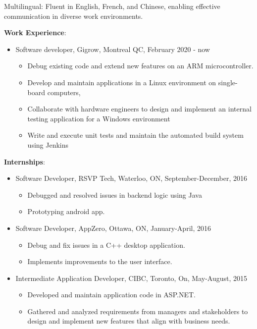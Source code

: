 \documentclass[letterpaper]{article}
\begin{document}
Multilingual: Fluent in English, French, and Chinese, enabling effective communication in diverse work environments.\\



\begin{large}
\textbf{Work Experience}:
\end{large}
\begin{itemize}[leftmargin=5.5mm]
\item Software developer, Gigrow, Montreal QC, February 2020 - now
	\begin{itemize} 
	\item Debug existing code and extend new features on an ARM microcontroller. 
	\item Develop and maintain applications in a Linux environment on single-board computers,
	\item Collaborate with hardware engineers to design and implement an internal testing application for a Windows environment
	\item Write and execute unit tests and maintain the automated build system using Jenkins
	\end{itemize}
\end{itemize}

\begin{large}
\textbf{Internships}:
\end{large}
\begin{itemize}[leftmargin=*]
\item Software Developer,  RSVP Tech, Waterloo, ON, September-December, 2016
	\begin{itemize}
     \item Debugged and resolved issues in backend logic using Java
     \item Prototyping android app.
     \end{itemize}
\item Software Developer,  AppZero, Ottawa, ON, January-April, 2016
	\begin{itemize}
	\item Debug and fix issues in a C++ desktop application.
	\item Implements improvements to the user interface.
	\end{itemize}
\item Intermediate Application Developer, CIBC, Toronto, On, May-August, 2015 
\begin{itemize}
    \item Developed and maintain application code in ASP.NET.
 	\item Gathered and analyzed requirements from managers and stakeholders to design and implement new features that align with business needs.
    \end{itemize}

\end{itemize}
\end{document}
